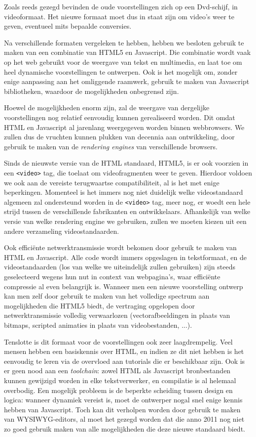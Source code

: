 Zoals reeds gezegd bevinden de oude voorstellingen zich op een Dvd-schijf, in videoformaat. Het nieuwe formaat moet dus in staat zijn om video's weer te geven, eventueel mits bepaalde conversies.

Na verschillende formaten vergeleken te hebben, hebben we besloten gebruik te maken van een combinatie van HTML5 en Javascript. Die combinatie wordt vaak op het web gebruikt voor de weergave van tekst en multimedia, en laat toe om heel dynamische voorstellingen te ontwerpen. Ook is het mogelijk om, zonder enige aanpassing aan het omliggende raamwerk, gebruik te maken van Javascript bibliotheken, waardoor de mogelijkheden onbegrensd zijn.

Hoewel de mogelijkheden enorm zijn, zal de weergave van dergelijke voorstellingen nog relatief eenvoudig kunnen gerealiseerd worden. Dit omdat HTML en Javascript al jarenlang weergegeven worden binnen webbrowsers. We zullen dus de vruchten kunnen plukken van decennia aan ontwikkeling, door gebruik te maken van de \emph{rendering engines} van verschillende browsers.

Sinds de nieuwste versie van de HTML standaard, HTML5, is er ook voorzien in een \texttt{<video>} tag, die toelaat om videofragmenten weer te geven. Hierdoor voldoen we ook aan de vereiste terugwaartse compatibiliteit, al is het met enige beperkingen. Momenteel is het immers nog niet duidelijk welke videostandaard algemeen zal ondersteund worden in de \texttt{<video>} tag, meer nog, er woedt een hele strijd tussen de verschillende fabrikanten en ontwikkelaars. Afhankelijk van welke versie van welke rendering engine we gebruiken, zullen we moeten kiezen uit een andere verzameling videostandaarden.

Ook efficiënte netwerktransmissie wordt bekomen door gebruik te maken van HTML en Javascript. Alle code wordt immers opgeslagen in tekstformaat, en de videostandaarden (los van welke we uiteindelijk zullen gebruiken) zijn steeds geselecteerd wegens hun nut in context van webpagina's, waar efficiënte compressie al even belangrijk is. Wanneer men een nieuwe voorstelling ontwerp kan men zelf door gebruik te maken van het volledige spectrum aan mogelijkheden die HTML5 biedt, de vertraging opgelopen door netwerktransmissie volledig verwaarlozen (vectorafbeeldingen in plaats van bitmaps, scripted animaties in plaats van videobestanden, ...).

Tenslotte is dit formaat voor de voorstellingen ook zeer laagdrempelig. Veel mensen hebben een basiskennis over HTML, en indien ze dit niet hebben is het eenvoudig te leren via de overvloed aan tutorials die er beschikbaar zijn. Ook is er geen nood aan een \emph{toolchain}: zowel HTML als Javascript bronbestanden kunnen gewijzigd worden in elke tekstverwerker, en compilatie is al helemaal overbodig.
Een mogelijk probleem is de beperkte scheiding tussen design en logica: wanneer dynamiek vereist is, moet de ontwerper nogal snel enige kennis hebben van Javascript. Toch kan dit verholpen worden door gebruik te maken van WYSIWYG-editors, al moet het gezegd worden dat die anno 2011 nog niet zo goed gebruik maken van alle mogelijkheden die deze nieuwe standaard biedt.

